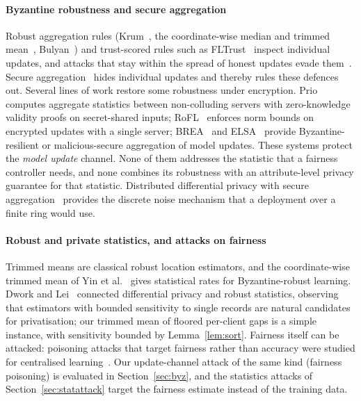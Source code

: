 \paragraph{Byzantine robustness and secure aggregation}
Robust aggregation rules (Krum~\citep{blanchard2017krum}, the coordinate-wise median and trimmed mean~\citep{yin2018byzantine}, Bulyan~\citep{mhamdi2018hidden}) and trust-scored rules such as FLTrust~\citep{cao2021fltrust} inspect individual updates, and attacks that stay within the spread of honest updates evade them~\citep{baruch2019little,xie2019fall}. Secure aggregation~\citep{bonawitz2017practical} hides individual updates and thereby rules these defences out. Several lines of work restore some robustness under encryption. Prio~\citep{corrigangibbs2017prio} computes aggregate statistics between non-colluding servers with zero-knowledge validity proofs on secret-shared inputs; RoFL~\citep{lycklama2023rofl} enforces norm bounds on encrypted updates with a single server; BREA~\citep{so2021byzantine} and ELSA~\citep{rathee2023elsa} provide Byzantine-resilient or malicious-secure aggregation of model updates. These systems protect the \emph{model update} channel. None of them addresses the statistic that a fairness controller needs, and none combines its robustness with an attribute-level privacy guarantee for that statistic. Distributed differential privacy with secure aggregation~\citep{kairouz2021distributed} provides the discrete noise mechanism that a deployment over a finite ring would use.

\paragraph{Robust and private statistics, and attacks on fairness}
Trimmed means are classical robust location estimators, and the coordinate-wise trimmed mean of Yin et al.~\citep{yin2018byzantine} gives statistical rates for Byzantine-robust learning. Dwork and Lei~\citep{dwork2009robust} connected differential privacy and robust statistics, observing that estimators with bounded sensitivity to single records are natural candidates for privatisation; our trimmed mean of floored per-client gaps is a simple instance, with sensitivity bounded by Lemma~\ref{lem:sort}. Fairness itself can be attacked: poisoning attacks that target fairness rather than accuracy were studied for centralised learning~\citep{solans2020poisoning,mehrabi2021exacerbating}. Our update-channel attack of the same kind (fairness poisoning) is evaluated in Section~\ref{sec:byz}, and the statistics attacks of Section~\ref{sec:statattack} target the fairness estimate instead of the training data.

